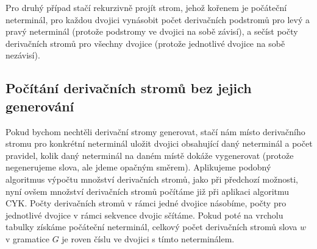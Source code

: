 \documentclass{article}
\begin{document}
Pro druhý případ stačí rekurzivně projít strom, jehož kořenem je počáteční
neterminál, pro každou dvojici vynásobit počet derivačních podstromů pro
levý a pravý neterminál (protože podstromy ve dvojici na sobě závisí),
a sečíst počty derivačních stromů pro všechny dvojice (protože
jednotlivé dvojice na sobě nezávisí).

\subsection{Počítání derivačních stromů bez jejich generování}

Pokud bychom nechtěli derivační stromy generovat, stačí nám místo
derivačního stromu pro konkrétní neterminál uložit dvojici obsahující
daný neterminál a počet pravidel, kolik daný neterminál na daném místě
dokáže vygenerovat (protože negenerujeme slova, ale jdeme opačným směrem).
Aplikujeme podobný algoritmus výpočtu množství derivačních stromů, jako
při předchozí možnosti, nyní ovšem množství derivačních stromů počítáme
již při aplikaci algoritmu CYK. Počty derivačních stromů v rámci jedné
dvojice násobíme, počty pro jednotlivé dvojice v rámci sekvence dvojic
sčítáme. Pokud poté na vrcholu tabulky získáme počáteční neterminál,
celkový počet derivačních stromů slova $w$ v gramatice $G$ je roven
číslu ve dvojici s tímto neterminálem.
\end{document}
